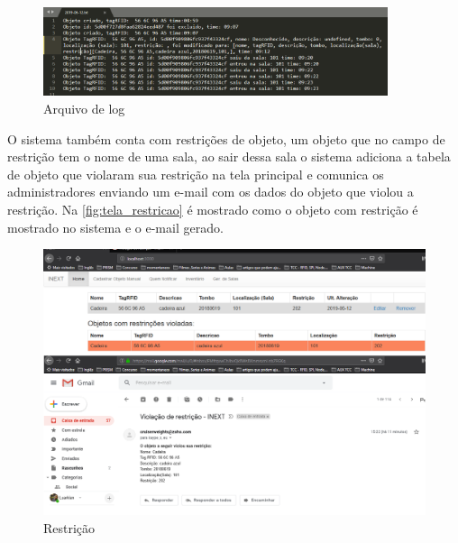 \begin{figure}[H]
              \caption{\label{fig:tela_log}Arquivo de log}
              \centering
              \includegraphics[width=0.9\textwidth]{Figuras/tela_logs.png}
\end{figure}
\par
O sistema também conta com restrições de objeto, um objeto que no campo de restrição tem o nome de uma sala, ao sair dessa sala o sistema adiciona a tabela de objeto que violaram sua restrição na tela principal e comunica os administradores enviando um e-mail com os dados do objeto que violou a restrição. Na \autoref{fig:tela_restricao} é mostrado como o objeto com restrição é mostrado no sistema e o e-mail gerado.
\begin{figure}[H]
              \caption{\label{fig:tela_restricao}Restrição}
              \centering
              \includegraphics[width=1\textwidth]{Figuras/tela_restricao.png}
\end{figure}
